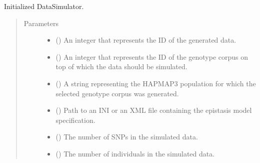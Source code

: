 \documentclass[a4paper,10pt,english]{sphinxhowto}
\begin{document}
\begin{fulllineitems}
\begin{fulllineitems}
\begin{quote}
\begin{description}
\end{description}\end{quote}

\end{fulllineitems}


\begin{fulllineitems}
\label{\detokenize{utils:utils.data_simulator.DataSimulator.__init__}}
Initialized DataSimulator.
\begin{quote}\begin{description}
\item[{Parameters}] \leavevmode\begin{itemize}
\item {} 
 () \textendash{} An integer that represents the ID of the generated data.

\item {} 
 () \textendash{} An integer that represents the ID of the genotype corpus on top of which
the data should be simulated.

\item {} 
 () \textendash{} A string representing the HAPMAP3 population for which the selected genotype corpus was
generated.

\item {} 
 () \textendash{} Path to an INI or an XML file containing the epistasis model specification.

\item {} 
 () \textendash{} The number of SNPs in the simulated data.

\item {} 
 () \textendash{} The number of individuals in the simulated data.


\end{itemize}
\end{description}
\end{quote}
\end{fulllineitems}
\end{fulllineitems}
\end{document}
